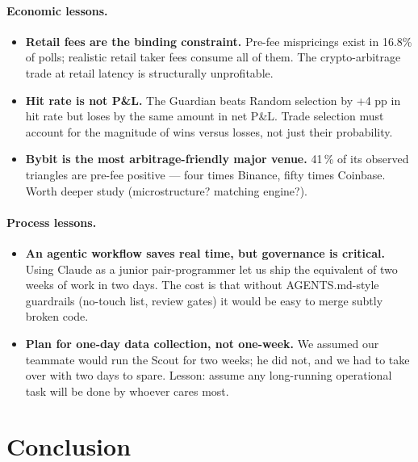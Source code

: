 \documentclass[11pt,a4paper]{article}
\begin{document}
\paragraph{Economic lessons.}
\begin{itemize}
    \item \textbf{Retail fees are the binding constraint.} Pre-fee mispricings
          exist in 16.8\% of polls; realistic retail taker fees consume all of
          them. The crypto-arbitrage trade at retail latency is structurally
          unprofitable.
    \item \textbf{Hit rate is not P\&L.} The Guardian beats Random selection by
          +4 pp in hit rate but loses by the same amount in net P\&L. Trade
          selection must account for the magnitude of wins versus losses, not
          just their probability.
    \item \textbf{Bybit is the most arbitrage-friendly major venue.} 41\,\% of its
          observed triangles are pre-fee positive --- four times Binance, fifty
          times Coinbase. Worth deeper study (microstructure? matching engine?).
\end{itemize}

\paragraph{Process lessons.}
\begin{itemize}
    \item \textbf{An agentic workflow saves real time, but governance is critical.}
          Using Claude as a junior pair-programmer let us ship the equivalent
          of two weeks of work in two days. The cost is that without
          AGENTS.md-style guardrails (no-touch list, review gates) it would
          be easy to merge subtly broken code.
    \item \textbf{Plan for one-day data collection, not one-week.} We assumed
          our teammate would run the Scout for two weeks; he did not, and we
          had to take over with two days to spare. Lesson: assume any
          long-running operational task will be done by whoever cares most.
\end{itemize}

\section{Conclusion}
\label{sec:conclusion}
\end{document}
